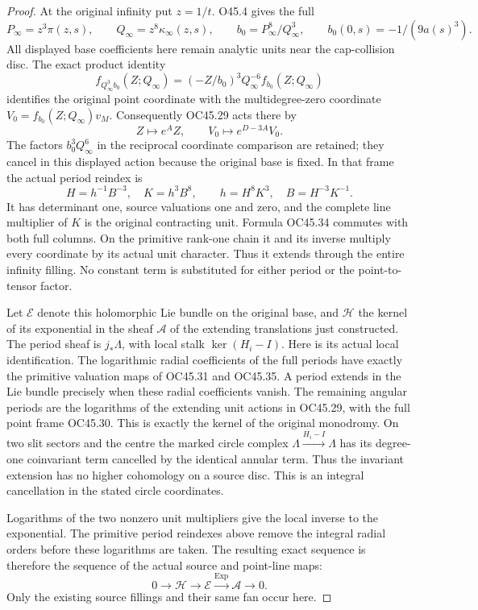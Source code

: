 \begin{proof}
At the original infinity put \(z=1/t\). O45.4 gives the full
\[
 P_\infty=z^3\pi(z,s),\qquad Q_\infty=z^8\kappa_\infty(z,s),
 \qquad b_0=P_\infty^8/Q_\infty^3,
 \qquad b_0(0,s)=-1/(9a(s)^3).
 \tag{OC45.32}
\]
All displayed base coefficients here remain analytic units near
the cap-collision disc. The exact product identity
\[
 f_{Q_\infty^3b_0}(Z;Q_\infty)
       =(-Z/b_0)^3Q_\infty^{-6}f_{b_0}(Z;Q_\infty)
 \tag{OC45.33}
\]
identifies the original point coordinate with the multidegree-zero
coordinate \(V_0=f_{b_0}(Z;Q_\infty)v_M\). Consequently OC45.29
acts there by
\[
 Z\longmapsto e^A Z,\qquad V_0\longmapsto e^{D-3A}V_0.
 \tag{OC45.34}
\]
The factors \(b_0^3Q_\infty^6\) in the reciprocal coordinate
comparison are retained; they cancel in this displayed action
because the original base is fixed. In that frame the actual
period reindex is
\[
 H=h^{-1}B^{-3},\quad K=h^3B^8,\qquad
 h=H^8K^3,\quad B=H^{-3}K^{-1}.
 \tag{OC45.35}
\]
It has determinant one, source valuations one and zero, and the
complete line multiplier of \(K\) is the original contracting
unit. Formula OC45.34 commutes with both full columns. On the
primitive rank-one chain it and its inverse multiply every
coordinate by its actual unit character. Thus it extends through
the entire infinity filling. No constant term is substituted for
either period or the point-to-tensor factor.

Let \(\mathscr E\) denote this holomorphic Lie bundle on the
original base, and \(\mathscr H\) the kernel of its exponential
in the sheaf \(\mathscr A\) of the extending translations just
constructed. The period sheaf is \(j_*\Lambda\), with local stalk
\(\ker(H_i-I)\). Here is its actual local identification. The
logarithmic radial coefficients of the full periods have exactly
the primitive valuation maps of OC45.31 and OC45.35. A period
extends in the Lie bundle precisely when these radial coefficients
vanish. The remaining angular periods are the logarithms of
the extending unit actions in OC45.29, with the full point frame
OC45.30. This is exactly the kernel of the original monodromy.
On two slit sectors and the centre the marked circle complex
\(\Lambda\xrightarrow{H_i-I}\Lambda\) has its degree-one
coinvariant term cancelled by the identical annular term.
Thus the invariant extension has no higher cohomology on a
source disc. This is an integral cancellation in the stated
circle coordinates.

Logarithms of the two nonzero unit multipliers give the local
inverse to the exponential. The primitive period reindexes above
remove the integral radial orders before these logarithms are
taken. The resulting exact sequence is therefore the sequence
of the actual source and point-line maps:
\[
 0\longrightarrow\mathscr H\longrightarrow\mathscr E
       \xrightarrow{\operatorname{Exp}}\mathscr A\longrightarrow0.
 \tag{OC45.36}
\]
Only the existing source fillings and their same fan occur here.


\end{proof}
